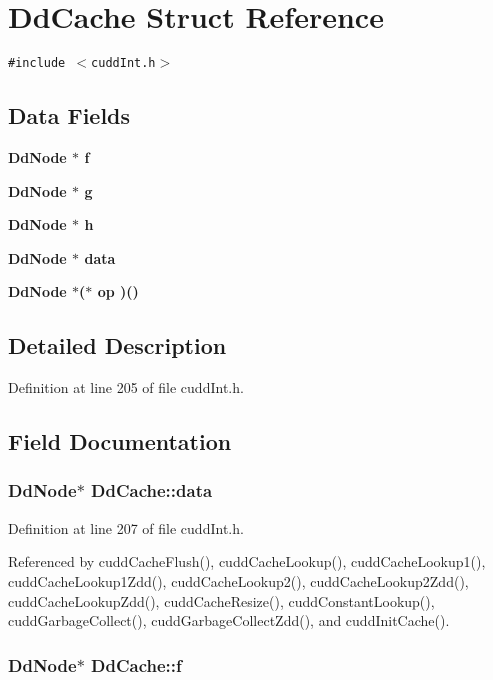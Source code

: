 \section{Dd\-Cache Struct Reference}
\label{structDdCache}
{\tt \#include $<$cudd\-Int.h$>$}

\subsection*{Data Fields}
\begin{CompactItemize}
\item 
\bf{Dd\-Node} $\ast$ \bf{f}
\item 
\bf{Dd\-Node} $\ast$ \bf{g}
\item 
\bf{Dd\-Node} $\ast$ \bf{h}
\item 
\bf{Dd\-Node} $\ast$ \bf{data}
\item 
\bf{Dd\-Node} $\ast$($\ast$ \bf{op} )()
\end{CompactItemize}


\subsection{Detailed Description}




Definition at line 205 of file cudd\-Int.h.

\subsection{Field Documentation}
\subsubsection{\setlength{\rightskip}{0pt plus 5cm}\bf{Dd\-Node}$\ast$ \bf{Dd\-Cache::data}}\label{structDdCache_9905702dc8e111587a301164f51fd0f0}




Definition at line 207 of file cudd\-Int.h.

Referenced by cudd\-Cache\-Flush(), cudd\-Cache\-Lookup(), cudd\-Cache\-Lookup1(), cudd\-Cache\-Lookup1Zdd(), cudd\-Cache\-Lookup2(), cudd\-Cache\-Lookup2Zdd(), cudd\-Cache\-Lookup\-Zdd(), cudd\-Cache\-Resize(), cudd\-Constant\-Lookup(), cudd\-Garbage\-Collect(), cudd\-Garbage\-Collect\-Zdd(), and cudd\-Init\-Cache().
\subsubsection{\setlength{\rightskip}{0pt plus 5cm}\bf{Dd\-Node}$\ast$ \bf{Dd\-Cache::f}}\label{structDdCache_74c07792181f1d898f9fb4524c8942ad}





